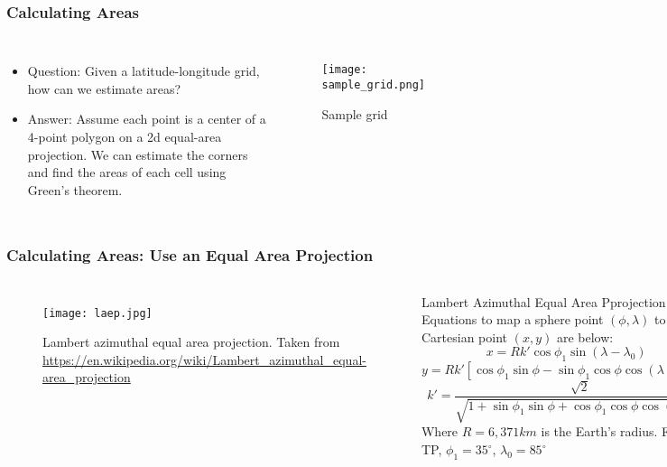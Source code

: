 \begin{frame}
\frametitle{Calculating Areas}
\begin{columns}
\begin{itemize}
    \item Question: Given a latitude-longitude grid, how can we estimate areas?
    \item Answer: Assume each point is a center of a 4-point polygon on a 2d equal-area projection. We can estimate the corners and find the areas of each cell using Green's theorem.
\end{itemize}

\begin{figure}[ht]
\vspace*{-.5cm}
\centering
\begin{minipage}{1\linewidth}
\texttt{[image: sample\_grid.png]}
\caption{\tiny{Sample grid}}
\end{minipage}
\end{figure}
\end{columns}
\end{frame}

\begin{frame}
\frametitle{Calculating Areas: Use an Equal Area Projection}
\begin{columns}
\begin{figure}
\vspace*{-.6cm}
\begin{minipage}{1\columnwidth}
\centering
\texttt{[image: laep.jpg]}
\caption{\tiny{Lambert azimuthal equal area projection. Taken from \url{https://en.wikipedia.org/wiki/Lambert_azimuthal_equal-area_projection}}}
\end{minipage}
\end{figure}
\begin{block}{Lambert Azimuthal Equal Area Pprojection}
Equations to map a sphere point $(\phi, \lambda)$ to a Cartesian point $(x,y)$  are below:
\begin{equation*}
x = R k' \cos\phi_{1}\sin(\lambda - \lambda_0)
\end{equation*}
\begin{equation*}
y = R k'[\cos\phi_{1}\sin\phi - \sin\phi_{1}\cos\phi \cos(\lambda - \lambda_{0})]
\end{equation*}
\begin{equation*}
k' = \frac{\sqrt{2}}{\sqrt{1+\sin\phi_{1}\sin\phi + \cos\phi_{1}\cos\phi \cos(\lambda\lambda_{0})}}
\end{equation*}
Where $R=6,371 km$ is the Earth's radius. For the TP, $\phi_{1} = 35^{\circ}$, $\lambda_{0}=85^{\circ}$ 
\end{block}
\end{columns}
\end{frame}

